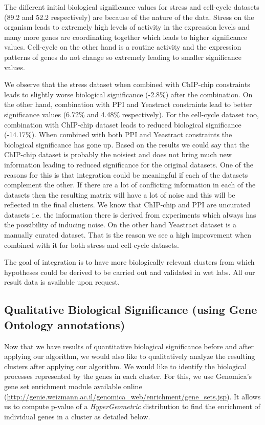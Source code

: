 The different initial biological significance values for stress and cell-cycle datasets (89.2 and 52.2 respectively) are because of the nature of the data. Stress on the organism 
leads to extremely high levels of activity 
in the expression levels and many more genes are coordinating together which leads to higher significance values. Cell-cycle on the other hand is a routine activity and the 
expression patterns of genes do not change so extremely leading to smaller significance values.

We observe that the stress dataset when combined with ChIP-chip constraints leads to slightly worse biological significance (-2.8\%) after the combination. 
On the other hand, combination with PPI and Yeastract constraints lead to better significance values (6.72\% and 4.48\% respectively). For 
the cell-cycle dataset too, combination with ChIP-chip dataset leads to reduced biological significance (-14.17\%). When combined with both PPI and Yeastract constraints the biological significance 
has gone up. Based on the results we could say that the ChIP-chip dataset is probably the noisiest and does not bring much new information leading to reduced significance for the original datasets. 
One of the reasons for this is that integration could be meaningful if each of the datasets complement the other. If there are 
a lot of conflicting information in each of the datasets then the resulting matrix will have a lot of noise and this will be reflected in the final clusters. We know that ChIP-chip and PPI are uncurated datasets i.e. the information there is derived from experiments which always has the possibility of inducing noise. On the other hand Yeastract 
dataset is a manually curated dataset. That is the reason we see a high improvement when combined with it for both stress and cell-cycle datasets. 
  
The goal of integration is to have more biologically relevant clusters from which hypotheses could be derived to be carried out and validated in wet labs. All our result data is available upon request. 

\subsection{Qualitative Biological Significance (using Gene Ontology annotations)} \label{semisup_biosig_go}
Now that we have results of quantitative biological significance before and after applying our algorithm, we would also like to qualitatively analyze the resulting clusters after 
applying our algorithm. We would like to identify the biological processes represented by the genes in each cluster. For this, we use Genomica's gene set enrichment module available online (\url{http://genie.weizmann.ac.il/genomica_web/enrichment/gene_sets.jsp}). It allows us to compute 
p-value of a \textit{HyperGeometric} distribution to find the enrichment of individual genes in a cluster as detailed below.

